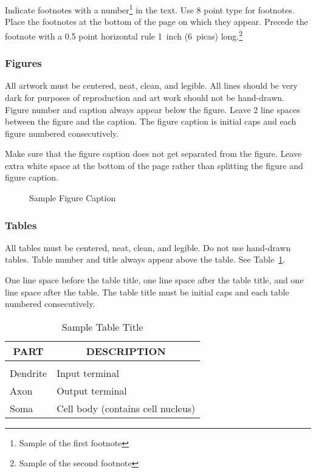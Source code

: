 \documentclass[twoside]{article}
\begin{document}
Indicate footnotes with a number\footnote{Sample of the first footnote} in the text. Use 8 point type for footnotes. Place the footnotes at
the bottom of the page  on which they appear. Precede the footnote with a 0.5 point horizontal rule  1~inch (6~picas) long.\footnote{Sample
of the second footnote}

\subsubsection{Figures}

All artwork must be centered, neat, clean, and legible.  All lines should be very dark for purposes of reproduction and art work should not
be hand-drawn.  Figure number and caption always appear below the figure.  Leave 2 line spaces between the figure and the caption. The
figure caption is initial caps and each figure numbered consecutively.

Make sure that the figure caption does not get separated from the figure. Leave extra white space at the bottom of the page rather than
splitting the figure and figure caption.
\begin{figure}[h]
\vspace{1in} \caption{Sample Figure Caption}
\end{figure}

\subsubsection{Tables}

All tables must be centered, neat, clean, and legible. Do not use hand-drawn tables. Table number and title always appear above the table.
See Table~\ref{sample-table}.

One line space before the table title, one line space after the table title, and one line space after the table. The table title must be
initial caps and each table numbered consecutively.

\begin{table}[h]
\caption{Sample Table Title} \label{sample-table}
\begin{center}
\begin{tabular}{ll}
\multicolumn{1}{c}{\bf PART}  &\multicolumn{1}{c}{\bf DESCRIPTION} \\
\hline \\
Dendrite         &Input terminal \\
Axon             &Output terminal \\
Soma             &Cell body (contains cell nucleus) \\
\end{tabular}
\end{center}
\end{table}
\end{document}

